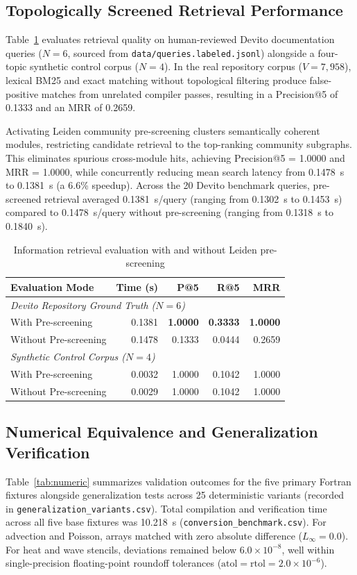 \documentclass[conference]{IEEEtran}
\begin{document}
\subsection{Topologically Screened Retrieval Performance}
Table~\ref{tab:retrieval-eval} evaluates retrieval quality on human-reviewed Devito documentation queries ($N=6$, sourced from \texttt{data/queries.labeled.jsonl}) alongside a four-topic synthetic control corpus ($N=4$). In the real repository corpus ($V=7,958$), lexical BM25 and exact matching without topological filtering produce false-positive matches from unrelated compiler passes, resulting in a Precision@5 of 0.1333 and an MRR of 0.2659. 

Activating Leiden community pre-screening clusters semantically coherent modules, restricting candidate retrieval to the top-ranking community subgraphs. This eliminates spurious cross-module hits, achieving Precision@5 = 1.0000 and MRR = 1.0000, while concurrently reducing mean search latency from 0.1478~s to 0.1381~s (a 6.6\% speedup). Across the 20 Devito benchmark queries, pre-screened retrieval averaged 0.1381~s/query (ranging from 0.1302~s to 0.1453~s) compared to 0.1478~s/query without pre-screening (ranging from 0.1318~s to 0.1840~s).

\begin{table}[!t]
\caption{Information retrieval evaluation with and without Leiden pre-screening}
\label{tab:retrieval-eval}\centering\scriptsize
\setlength{\tabcolsep}{3pt}
\begin{tabularx}{\columnwidth}{l r r r r}\toprule
Evaluation Mode & Time (s) & P@5 & R@5 & MRR \\ \midrule
\multicolumn{5}{l}{\textit{Devito Repository Ground Truth ($N=6$)}} \\
With Pre-screening & 0.1381 & \textbf{1.0000} & \textbf{0.3333} & \textbf{1.0000} \\
Without Pre-screening & 0.1478 & 0.1333 & 0.0444 & 0.2659 \\ \midrule
\multicolumn{5}{l}{\textit{Synthetic Control Corpus ($N=4$)}} \\
With Pre-screening & 0.0032 & 1.0000 & 0.1042 & 1.0000 \\
Without Pre-screening & 0.0029 & 1.0000 & 0.1042 & 1.0000 \\
\bottomrule\end{tabularx}
\end{table}

\subsection{Numerical Equivalence and Generalization Verification}
Table~\ref{tab:numeric} summarizes validation outcomes for the five primary Fortran fixtures alongside generalization tests across 25 deterministic variants (recorded in \texttt{generalization\_variants.csv}). Total compilation and verification time across all five base fixtures was 10.218~s (\texttt{conversion\_benchmark.csv}). For advection and Poisson, arrays matched with zero absolute difference ($L_\infty = 0.0$). For heat and wave stencils, deviations remained below $6.0\times 10^{-8}$, well within single-precision floating-point roundoff tolerances ($\mathrm{atol} = \mathrm{rtol} = 2.0\times 10^{-6}$).
\end{document}
